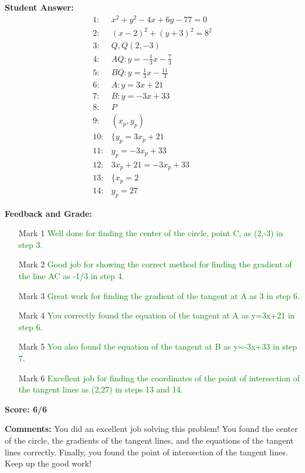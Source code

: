 \documentclass{article}
\begin{document}
\textbf{Student Answer:}
\begin{align*}
1: & x^2+y^2-4x+6y-77=0 \\
2: & (x-2)^2+(y+3)^2=8^2 \\
3: & Q,Q(2,-3) \\
4: & AQ:y=-\frac{1}{3}x-\frac{7}{3} \\
5: & BQ:y=\frac{1}{3}x-\frac{11}{3} \\
6: & A:y=3x+21 \\
7: & B:y=-3x+33 \\
8: & P \\
9: & (x_p,y_p) \\
10: & \{y_p=3x_p+21 \\
11: & y_p=-3x_p+33 \\
12: & 3x_p+21=-3x_p+33 \\
13: & \{x_p=2 \\
14: & y_p=27
\end{align*}

\textbf{Feedback and Grade:}
\begin{itemize}
\item[Mark 1] \textcolor{green}{Well done for finding the center of the circle, point C, as (2,-3) in step 3.}
\item[Mark 2] \textcolor{green}{Good job for showing the correct method for finding the gradient of the line AC as -1/3 in step 4.}
\item[Mark 3] \textcolor{green}{Great work for finding the gradient of the tangent at A as 3 in step 6.}
\item[Mark 4] \textcolor{green}{You correctly found the equation of the tangent at A as y=3x+21 in step 6.}
\item[Mark 5] \textcolor{green}{You also found the equation of the tangent at B as y=-3x+33 in step 7.}
\item[Mark 6] \textcolor{green}{Excellent job for finding the coordinates of the point of intersection of the tangent lines as (2,27) in steps 13 and 14.}
\end{itemize}

\textbf{Score: 6/6}

\textbf{Comments:} You did an excellent job solving this problem! You found the center of the circle, the gradients of the tangent lines, and the equations of the tangent lines correctly. Finally, you found the point of intersection of the tangent lines. Keep up the good work!
\end{document}
